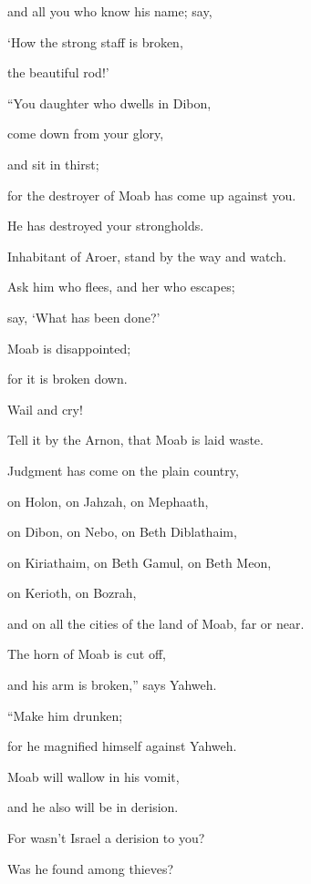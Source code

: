 {\par }{\QB and all you who know his name; say,
\par }{\Q ‘How the strong staff is broken,
\par }{\QB the beautiful rod!’
\par }{\BB \par }{\Q {}“You daughter who dwells in Dibon,
\par }{\QB come down from your glory,
\par }{\QB and sit in thirst;
\par }{\Q for the destroyer of Moab has come up against you.
\par }{\QB He has destroyed your strongholds.
\par }{\Q {}Inhabitant of Aroer, stand by the way and watch.
\par }{\QB Ask him who flees, and her who escapes;
\par }{\QB say, ‘What has been done?’
\par }{\Q {}Moab is disappointed;
\par }{\QB for it is broken down.
\par }{\Q Wail and cry!
\par }{\QB Tell it by the Arnon, that Moab is laid waste.
\par }{\Q {}Judgment has come on the plain country,
\par }{\QB on Holon, on Jahzah, on Mephaath,
\par }{\QB {}on Dibon, on Nebo, on Beth Diblathaim,
\par }{\QB {}on Kiriathaim, on Beth Gamul, on Beth Meon,
\par }{\QB {}on Kerioth, on Bozrah,
\par }{\QB and on all the cities of the land of Moab, far or near.
\par }{\Q {}The horn of Moab is cut off,
\par }{\QB and his arm is broken,” says Yahweh.
\par }{\BB \par }{\Q {}“Make him drunken;
\par }{\QB for he magnified himself against Yahweh.
\par }{\Q Moab will wallow in his vomit,
\par }{\QB and he also will be in derision.
\par }{\Q {}For wasn’t Israel a derision to you?
\par }{\QB Was he found among thieves?
}

